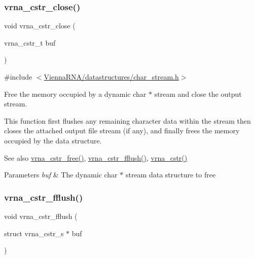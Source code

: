\subsubsection{\texorpdfstring{vrna\_cstr\_close()}{vrna\_cstr\_close()}}
{\footnotesize\ttfamily void vrna\+\_\+cstr\+\_\+close (\begin{DoxyParamCaption}\item[{vrna\+\_\+cstr\+\_\+t}]{buf }\end{DoxyParamCaption})}



{\ttfamily \#include $<$\mbox{\hyperlink{datastructures_2char__stream_8h}{Vienna\+R\+N\+A/datastructures/char\+\_\+stream.\+h}}$>$}



Free the memory occupied by a dynamic char $\ast$ stream and close the output stream. 

This function first flushes any remaining character data within the stream then closes the attached output file stream (if any), and finally free\textquotesingle{}s the memory occupied by the data structure.

\begin{DoxySeeAlso}{See also}
\mbox{\hyperlink{group__buffer__utils_ga7ec48ec280f699928c70428cc245dc77}{vrna\+\_\+cstr\+\_\+free()}}, \mbox{\hyperlink{group__buffer__utils_gab59ad4781f7de960bdd1af5b1965c94b}{vrna\+\_\+cstr\+\_\+fflush()}}, \mbox{\hyperlink{group__buffer__utils_gadb2818f368e10a3b60a96bb3c80228d2}{vrna\+\_\+cstr()}}
\end{DoxySeeAlso}

\begin{DoxyParams}{Parameters}
{\em buf} & The dynamic char $\ast$ stream data structure to free \\
\hline
\end{DoxyParams}
\mbox{\label{group__buffer__utils_gab59ad4781f7de960bdd1af5b1965c94b}} 
\subsubsection{\texorpdfstring{vrna\_cstr\_fflush()}{vrna\_cstr\_fflush()}}
{\footnotesize\ttfamily void vrna\+\_\+cstr\+\_\+fflush (\begin{DoxyParamCaption}\item[{struct vrna\+\_\+cstr\+\_\+s $\ast$}]{buf }\end{DoxyParamCaption})}



